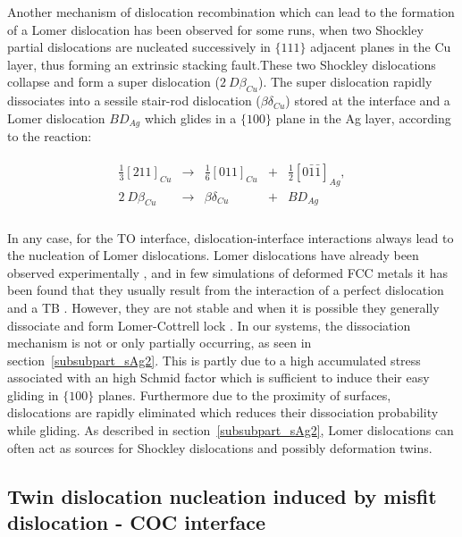 \documentclass[final,3p,times,twocolumn]{elsarticle}
\begin{document}
Another mechanism of dislocation recombination which can lead to the formation of a Lomer dislocation has been observed for some runs, when two Shockley partial dislocations are nucleated successively in $\lbrace111\rbrace$ adjacent planes in the Cu layer, thus forming an extrinsic stacking fault.These two Shockley dislocations collapse and form a super dislocation ($ 2~D\beta_{Cu} $).
The super dislocation rapidly dissociates into a sessile stair-rod dislocation ($\beta\delta_{Cu}$) stored at the interface and a Lomer dislocation $ BD_{Ag} $ which glides in a $\lbrace100\rbrace$ plane in the Ag layer, according to the reaction:

\begin{eqnarray}\label{4}
	\begin{array}{ccccc}
\frac{1}{3}\left[211\right]_{Cu} &\rightarrow & \frac{1}{6}\left[011\right]_{Cu} &+& \frac{1}{2}\left[0\bar{1}\bar{1}\right]_{Ag}, \\
2~D\beta_{Cu} &\rightarrow & \beta\delta_{Cu} &+& BD_{Ag} \\
	\end{array}
\end{eqnarray}

In any case, for the TO interface, dislocation-interface interactions always lead to the nucleation of Lomer dislocations. Lomer dislocations have already been observed experimentally \cite{bonneville90PML,mills89PMA}, and in few simulations of deformed FCC metals it has been found that they usually result from the interaction of a perfect dislocation and a TB \cite{wu09AM,sansoz07NL}. However, they are not stable and when it is possible they generally dissociate and form Lomer-Cottrell lock \cite{hirth82book,wu09AM}. In our systems, the dissociation mechanism is not or only partially occurring, as seen in section~\ref{subsubpart_sAg2}. This is partly due to a high accumulated stress associated with an high Schmid factor which is sufficient to induce their easy gliding in $\lbrace100\rbrace$ planes. Furthermore due to the proximity of surfaces, dislocations are rapidly eliminated which reduces their dissociation probability while gliding. As described in section~\ref{subsubpart_sAg2}, Lomer dislocations can often act as sources for Shockley dislocations and possibly deformation twins. 

	\subsection{Twin dislocation nucleation induced by misfit dislocation - COC interface}\label{subsubpart_twin}
	
\end{document}
